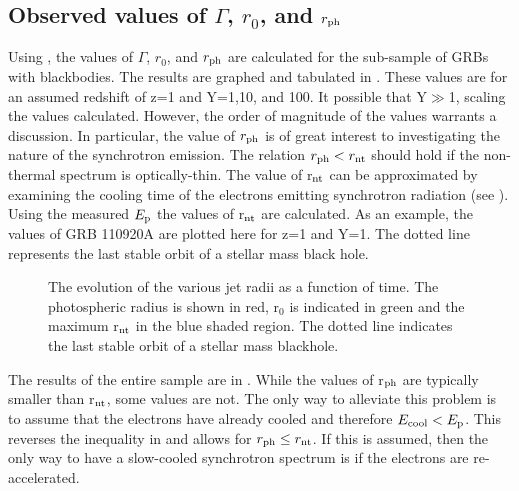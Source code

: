 \subsection{Observed values of $\Gamma$, $r_0$, and $r_{\rm ph}$}
Using , the values of $\Gamma$,
$r_0$, and $r_{\rm ph}$ are calculated for the sub-sample of GRBs with
blackbodies.  The results are graphed and tabulated
in . These values are for an assumed redshift
of z=1 and Y=1,10, and 100. It possible that Y$\gg$1, scaling the
values calculated. However, the order of magnitude of the values
warrants a discussion. In particular, the value of $r_{\rm ph}$ is of
great interest to investigating the nature of the synchrotron
emission. The relation $r_{\rm ph}<r_{\rm nt}$ should hold if the
non-thermal spectrum is optically-thin. The value of r$_{\rm nt}$ can
be approximated by examining the cooling time of the electrons
emitting synchrotron radiation (see ). Using the
measured $E_{\rm p}$ the values of r$_{\rm nt}$ are calculated. As an
example, the values of GRB 110920A are plotted here for z=1 and
Y=1. The dotted line represents the last stable orbit of a stellar
mass black hole.
\begin{figure}[t]
  \centering
  \caption{The evolution of the various jet radii as a function of
    time. The photospheric radius is shown in red, r$_0$ is indicated in green and the maximum r$_{\rm nt}$ in the blue shaded region. The dotted line indicates the last stable orbit of a stellar
    mass blackhole.}
  \label{fig:rnt110920}
\end{figure}
The results of the entire sample are in .
While the values of r$_{\rm ph}$ are typically smaller than r$_{\rm
  nt}$, some values are not. The only way to alleviate this problem is
to assume that the electrons have already cooled and therefore $E_{\rm
  cool} < E_{\rm p} $. This reverses the inequality in
 and allows for $r_{\rm ph}\le r_{\rm nt}$. If
this is assumed, then the only way to have a slow-cooled synchrotron
spectrum is if the electrons are re-accelerated.




 

